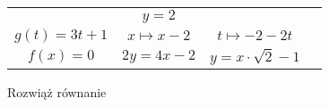 \documentclass[a4paper,12pt,leqno,fleqn]{article}
\begin{document}
\begin{tabularx}{\linewidth}{@{}XX@{}XX@{}}
&
  \begin{equation}
    y=2
  \end{equation}
\\
  \begin{equation}
    g(t)=3t+1
  \end{equation}
&
  \begin{equation}
    x\mapsto x-2
  \end{equation}
&
  \begin{equation}
    t\mapsto -2-2t
  \end{equation}
\\
  \begin{equation}
    f(x)=0
  \end{equation}
&
  \begin{equation}
    2y=4x-2
  \end{equation}
&
  \begin{equation}
    y=x\cdot\sqrt{2}-1
  \end{equation}
\\
\end{tabularx}

\newpage
Rozwiąż równanie
\end{document}

